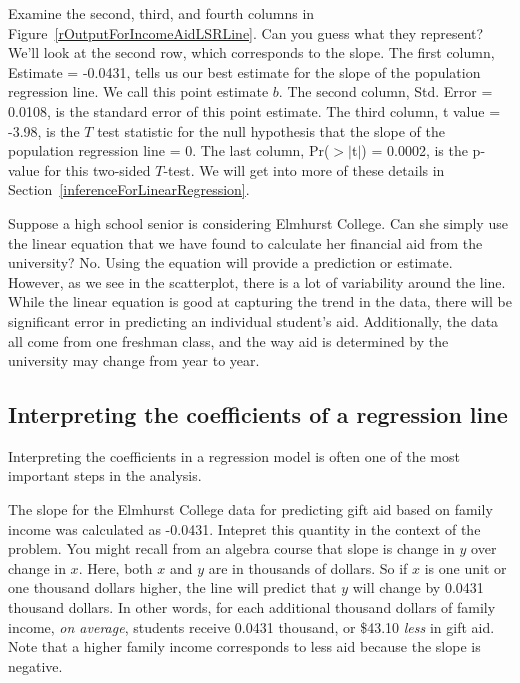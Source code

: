 \begin{examplewrap}
\begin{nexample}{Examine the second, third, and fourth columns in Figure~\ref{rOutputForIncomeAidLSRLine}. Can you guess what they represent?}
We'll look at the second row, which corresponds to the slope.  The first column, Estimate = -0.0431, tells us our best estimate for the slope of the population regression line.  We call this point estimate $b$.  The second column, Std. Error = 0.0108, is the standard error of this point estimate. The third column, t value = -3.98, is the $T$ test statistic for the null hypothesis that the slope of the population regression line = 0. The last column, Pr($>$$|$t$|$) = 0.0002, is the p-value for this two-sided $T$-test. We will get into more of these details in Section~\ref{inferenceForLinearRegression}.
\end{nexample}
\end{examplewrap}

\begin{examplewrap}
\begin{nexample}{Suppose a high school senior is considering Elmhurst College. Can she simply use the linear equation that we have found to calculate her financial aid from the university?}
No.  Using the equation will provide a prediction or estimate.  However, as we see in the scatterplot, there is a lot of variability around the line.  While the linear equation is good at capturing the trend in the data, there will be significant error in predicting an individual student's aid.  Additionally, the data all come from one freshman class, and the way aid is determined by the university may change from year to year.
\end{nexample}
\end{examplewrap} 


\subsection{Interpreting the coefficients of a regression line}


Interpreting the coefficients in a regression model is often one of the most important steps in the analysis.

\begin{examplewrap}
\begin{nexample}{The slope for the Elmhurst College data for predicting gift aid based on family income was calculated as -0.0431.  Intepret this quantity in the context of the problem. }
You might recall from an algebra course that slope is change in $y$ over change in $x$.  Here, both $x$ and $y$ are in thousands of dollars.  So if $x$ is one unit or one thousand dollars higher, the line will predict that $y$ will change by 0.0431 thousand dollars.  In other words, for each additional thousand dollars of family income, \emph{on average}, students receive 0.0431 thousand, or \$43.10 \emph{less} in gift aid. Note that a higher family income corresponds to less aid because the slope is negative.   
\end{nexample}
\end{examplewrap}

